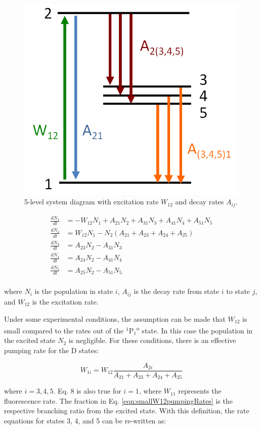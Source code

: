 \begin{figure} %
        \centering
                \includegraphics[width=.4\textwidth]{figures/5-level_general.png}
                \caption{5-level system diagram with excitation rate $W_{12}$ and decay rates $A_{ij}$.}
\label{fig:5lev}
\end{figure}


\begin{equation}
\begin{aligned}
\frac{dN_1}{dt} &= - W_{12}N_{1} + A_{21}N_{2} + A_{31}N_{3} + A_{41}N_{4} + A_{51} N_{5} \\
\frac{dN_2}{dt} &= W_{12}N_{1} - N_{2}(A_{21} + A_{23} + A_{24} + A_{25}) \\
\frac{dN_3}{dt} &= A_{23}N_{2} - A_{31}N_{3} \\
\frac{dN_4}{dt} &= A_{24}N_{2} - A_{41}N_{4} \\
\frac{dN_5}{dt} &= A_{25}N_{2} - A_{51}N_{5} \\
\end{aligned}
\label{eqn:rateEqn}
\end{equation}

\noindent
where $N_{i}$ is the population in state $i$, $A_{ij}$ is the decay rate from state $i$ to state $j$, and $W_{12}$ is the excitation rate.

Under some experimental conditions, the assumption can be made that $W_{12}$ is small compared to the rates out of the $^{1}$P$_{1}$\textsuperscript{o} state.  In this case the population in the excited state $N_{2}$ is negligible.  For these conditions, there is an effective pumping rate for the D states:

\begin{equation}
W_{1i} = W_{12}\frac{A_{2i}}{A_{21} + A_{23} + A_{24} + A_{25}}
\label{eqn:smallW12pumpingRates}
\end{equation}

\noindent
where $i = 3,4,5$.  Eq. 8 is also true for $i = 1$, where $W_{11}$ represents the fluorescence rate.  The fraction in Eq. \ref{eqn:smallW12pumpingRates} is the respective branching ratio from the excited state.  With this definition, the rate equations for states 3, 4, and 5 can be re-written as:

